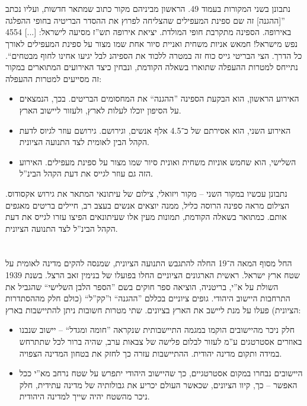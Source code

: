 \documentclass[]{../../../../tex/classes/homework}
\begin{document}
	\section{}
	נתבונן בשני המקורות בעמוד 49. הראשון מביניהם מקור כתוב שמתאר חדשות, ועליו נכתב ''[ההגנה] זה שם ספינת המעפילים שהצליחה לפרוץ את ההסדר הבריטיה בחופי ההפלגה באירופה. הספינה מתקרבת חופי המולדת. יציאת אירופה תש''ז מסיעה לישראל: [...] 4554 נפש מישראל! חמאש אניות משחית ואניית סיור אחת שמו מצור על ספינת המעפילים לאורך כל הדרך. הצי הבריטי גייס כוח זה במטרה ללכוד את הספיהנ לבל יגיעו אחינו לחוף מבטחים``. נתייחס למטרות ההעפלה שתוארו בשאלה הקודמת, ונבחין כיצד האירועים המתוארים במקור זה מסייעים למטרות ההעפלה: 
	\begin{itemize}
		\item האירוע הראשון, הוא הבקעת הספינה ''ההגנה`` את המחסומים הבריטים. בכך, הנמצאים על הסיפון יוכלו לעלות לארץ, ולעזור ליישוב הארץ. 
		\item האירוע השני, הוא אסירתם של כ־4.5 אלף אנשים, וגירושם. גירושם עוזר  לגיוס לדעת הקהל הבין לאומית לצד התנועה הציונית. 
		\item השלישי, הוא שחמש אוניות משחית ואונית סיור שמו מצור על ספינת מעפילים. האירוע הזה גם עוזר לגייס את דעת הקהל הבינ''ל. 
	\end{itemize}
	
	נתבונן עכשיו במקור השני – מקור ויזואלי, צילום של עיתונאי המתאר את גירוש אקסודוס. הצילום מראה ספינה הרוסה כליל, ממנה יוצאים אנשים בעצב רב, חיילים בריטים מאגפים אותם. כמתואר בשאלה הקודמת, תמונות מעין אלו שעיתונאים הפיצו עזרו לגייס את דעת הקהל הבינ''ל לצד התנועה הציונית. 
	
	\section{}
	החל מסוף המאה ה־19 החלה להתגבש התנועה הציונית, שמנסה להקים מדינה לאומית על שטח ארץ ישראל. ראשית הארגונים הציוניים החלו בפועלו של בנימין זאב הרצל. בשנת 1939 השולת על א''י, בריטניה, הוציאה ספר חוקים בשם ''הספר הלבן השלישי`` שהגביל את התרחבות היישוב היהודי. גופים ציוניים בכללם ''ההגנה`` ו''קק''ל`` (כולם חלק מההסתדרות הציונית) פעלו על מנת ליישב את הארץ בציונים. שתי מטרות חשובות ניתן להתיישבות בארץ: 
	\begin{itemize}
		\item חלק ניכר מהיישובים הוקמו במגמה התיישבותית שנקראה ''חומה ומגדל`` – יישוב שנבנו באוזרים אסטרטגים ע''מ לעזור לבלום פלישה של צבאות ערב, שהיה ברור לכל שתתרחש במידה ותקום מדינה יהודית. ההתיישבות עזרה כך לחזק את בטחון המדינה הצפויה. 
		\item היישובים נבחרו במקום אסטרטגיים, כך שהיישוב היהודי יתפרש על שטח נרחב מא''י ככל האפשר – כך, קיוו הציונים, שכאשר העולם יכריע את גבולותיה של מדינה עתידית, חלק ניכר מהשטח יהיה שייך למדינה היהודית. 
	\end{itemize}
	
\end{document}

